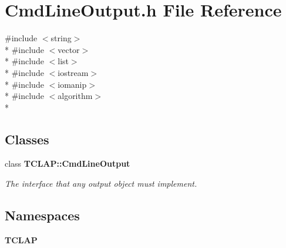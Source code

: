 \section{Cmd\+Line\+Output.\+h File Reference}
\label{CmdLineOutput_8h}
{\ttfamily \#include $<$string$>$}\\*
{\ttfamily \#include $<$vector$>$}\\*
{\ttfamily \#include $<$list$>$}\\*
{\ttfamily \#include $<$iostream$>$}\\*
{\ttfamily \#include $<$iomanip$>$}\\*
{\ttfamily \#include $<$algorithm$>$}\\*
\subsection*{Classes}
\begin{DoxyCompactItemize}
\item 
class {\bf T\+C\+L\+A\+P\+::\+Cmd\+Line\+Output}
\begin{DoxyCompactList}\small\item\em The interface that any output object must implement. \end{DoxyCompactList}\end{DoxyCompactItemize}
\subsection*{Namespaces}
\begin{DoxyCompactItemize}
\item 
 {\bf T\+C\+L\+A\+P}
\end{DoxyCompactItemize}
